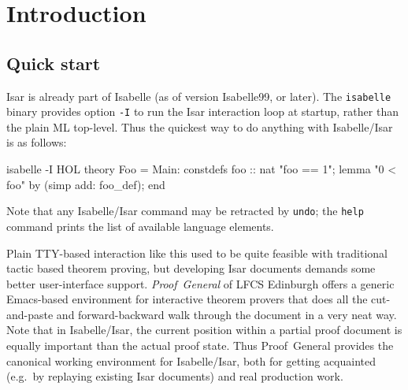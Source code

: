 
\chapter{Introduction}

\section{Quick start}

Isar is already part of Isabelle (as of version Isabelle99, or later).  The
\texttt{isabelle} binary provides option \texttt{-I} to run the Isar
interaction loop at startup, rather than the plain ML top-level.  Thus the
quickest way to do anything with Isabelle/Isar is as follows:
\begin{ttbox}
isabelle -I HOL\medskip
{}\medskip
theory Foo = Main:
constdefs foo :: nat  "foo == 1";
lemma "0 < foo" by (simp add: foo_def);
end
\end{ttbox}
Note that any Isabelle/Isar command may be retracted by \texttt{undo}; the
\texttt{help} command prints the list of available language elements.

Plain TTY-based interaction like this used to be quite feasible with
traditional tactic based theorem proving, but developing Isar documents
demands some better user-interface support.  \emph{Proof~General} of LFCS Edinburgh \cite{proofgeneral} offers a generic Emacs-based
environment for interactive theorem provers that does all the cut-and-paste
and forward-backward walk through the document in a very neat way.  Note that
in Isabelle/Isar, the current position within a partial proof document is
equally important than the actual proof state.  Thus Proof~General provides
the canonical working environment for Isabelle/Isar, both for getting
acquainted (e.g.\ by replaying existing Isar documents) and real production
work.

\medskip

